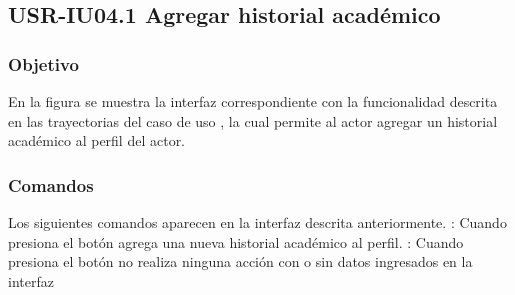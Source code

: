 \clearpage
\subsection{USR-IU04.1 Agregar historial académico}

\subsubsection{Objetivo}
En la figura  se muestra la interfaz correspondiente con la funcionalidad descrita en las
trayectorias del caso de uso  , la cual permite al actor agregar un historial académico al perfil del actor.

\subsubsection{Comandos}
Los siguientes comandos aparecen en la interfaz descrita anteriormente.
\Titem {} : Cuando presiona el botón agrega una nueva historial académico al perfil.
\Titem {} : Cuando presiona el botón no realiza ninguna acción con o sin datos ingresados en la interfaz


\clearpage
